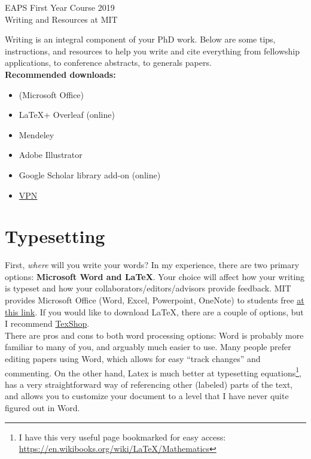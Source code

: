 \documentclass{article}
\begin{document}
\begin{center}
{\LARGE EAPS First Year Course 2019}\\
\vspace{10pt}
{\Large Writing and Resources at MIT}\\
\vspace{6pt}
\end{center}
Writing is an integral component of your PhD work. Below are some tips, instructions, and resources to help you write and cite everything from fellowship applications, to conference abstracts, to generals papers.\\

    \textbf{Recommended downloads:}
    \begin{itemize}
        \item (Microsoft Office)
        \item \LaTeX + Overleaf (online)
        \item Mendeley
        \item Adobe Illustrator
        \item Google Scholar library add-on (online)
        \item \href{https://ist.mit.edu/cisco-anyconnect}{VPN}
    \end{itemize}

\section*{Typesetting}
First, \emph{where} will you write your words? In my experience, there are two primary options:
\textbf{Microsoft Word and \LaTeX}.
Your choice will affect how your writing is typeset and how your collaborators/editors/advisors provide feedback. MIT provides Microsoft Office (Word, Excel, Powerpoint, OneNote) to students free \href{https://ist.mit.edu/office/license}{at this link}. If you would like to download \LaTeX, there are a couple of options, but I recommend \href{https://pages.uoregon.edu/koch/texshop/}{TexShop}.\\

There are pros and cons to both word processing options: Word is probably more familiar to many of you, and arguably much easier to use. Many people prefer editing papers using Word, which allows for easy ``track changes'' and commenting. On the other hand, Latex is much better at typesetting equations\footnote{I have this very useful page bookmarked for easy access: \href{ https://en.wikibooks.org/wiki/LaTeX/Mathematics}{https://en.wikibooks.org/wiki/LaTeX/Mathematics}}, has a very straightforward way of referencing other (labeled) parts of the text, and allows you to customize your document to a level that I have never quite figured out in Word. 
\end{document}
